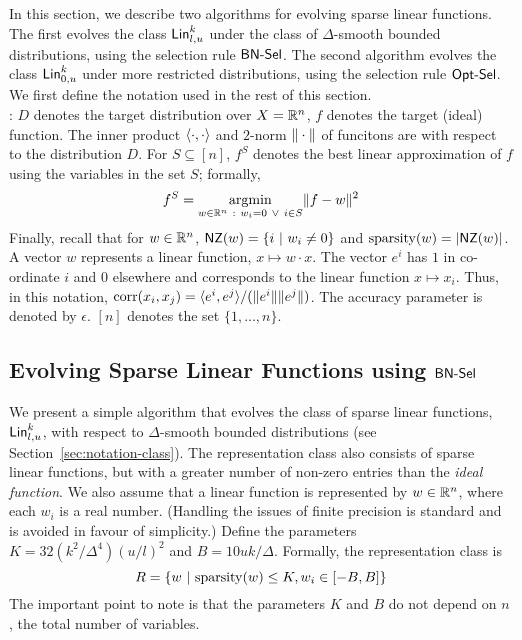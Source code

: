 In this section, we describe two algorithms for evolving sparse linear
functions. The first evolves the class $\mathsf{Lin}^k_{l, u}$ under the class of
$\Delta$-smooth bounded distributions, using the selection rule $\mathsf{BN\mbox{-}Sel}$. The
second algorithm evolves the class $\mathsf{Lin}^k_{0, u}$ under more restricted
distributions, using the selection rule $\mathsf{Opt\mbox{-}Sel}$. We first define the notation
used in the rest of this section.\smallskip \\

: $D$ denotes the target distribution over $X =
\mathbb{R}^n$, $f$ denotes the target (ideal) function. The inner product
$\langle \cdot, \cdot \rangle$ and $2$-norm $\Vert \cdot \Vert$ of funcitons are with
respect to the distribution $D$. For $S \subseteq [n]$, $f^S$ denotes the best
linear approximation of $f$ using the variables in the set $S$; formally,
\begin{align}
f^S = \underset{w \in \mathbb{R}^n~:~ w_i = 0 ~\vee~i \in S}{\mathrm{argmin}} \Vert f -
w \Vert^2 \label{eqn:artichoke}
\end{align}
Finally, recall that for $w \in \mathbb{R}^n$, $\mathsf{NZ}(w) = \{i ~|~ w_i \neq 0 \}$ and
$\mathrm{sparsity}(w) = |\mathsf{NZ}(w)|$. A vector $w$ represents a linear function, $x \mapsto
w \cdot x$. The vector $e^i$ has $1$ in co-ordinate $i$ and $0$ elsewhere and
corresponds to the linear function $x \mapsto x_i$. Thus, in this notation,
$\mathrm{corr}(x_i, x_j) = \langle e^i, e^j \rangle/(\Vert e^i \Vert\Vert e^j \Vert)$. The accuracy
parameter is denoted by $\epsilon$. $[n]$ denotes the set $\{1, \ldots, n\}$.

\subsection{Evolving Sparse Linear Functions using $\mathsf{BN\mbox{-}Sel}$}
\label{sec:sparse_linear}

We present a simple algorithm that evolves the class of sparse linear functions,
$\mathsf{Lin}^k_{l, u}$, with respect to $\Delta$-smooth bounded distributions (see
Section~\ref{sec:notation-class}). The representation class also consists of sparse
linear functions, but with a greater number of non-zero entries than the
\emph{ideal function}.  We also assume that a linear function is represented by
$w \in \mathbb{R}^n$, where each $w_i$ is a real number. (Handling the issues of
finite precision is standard and is avoided in favour of simplicity.) Define the
parameters $K = 32(k^2/\Delta^4)(u/l)^2$ and $B = 10 uk /\Delta$. Formally, the
representation class is
\[ 
R = \{ w ~|~ \mathrm{sparsity}(w) \leq K, w_i \in [-B, B] \}
\]
The important point to note is that the parameters $K$ and $B$ do not depend on
$n$, the total number of variables.

